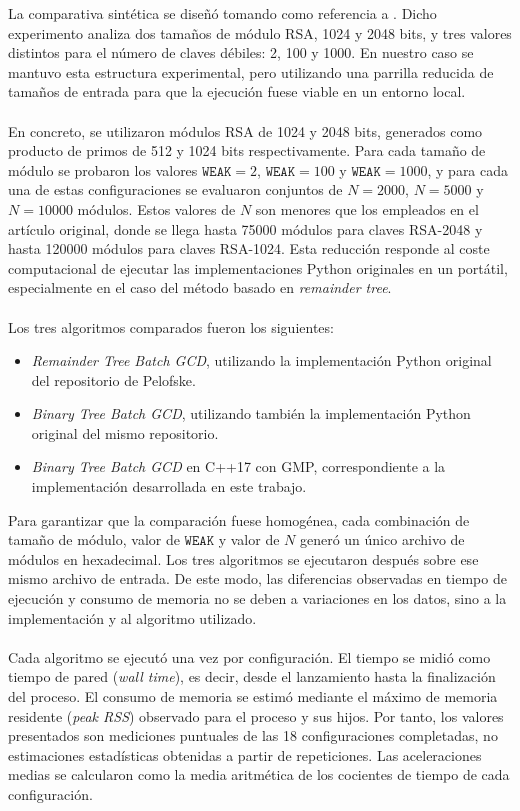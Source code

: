 La comparativa sintética se diseñó tomando como referencia a \citet[Figura 2]{pelofske2024efficient}. Dicho experimento analiza dos tamaños de módulo RSA, 1024 y 2048 bits, y tres valores distintos para el número de claves débiles: 2, 100 y 1000. En nuestro caso se mantuvo esta estructura experimental, pero utilizando una parrilla reducida de tamaños de entrada para que la ejecución fuese viable en un entorno local.
\\
\\
En concreto, se utilizaron módulos RSA de 1024 y 2048 bits, generados como producto de primos de 512 y 1024 bits respectivamente. Para cada tamaño de módulo se probaron los valores \(\texttt{WEAK}=2\), \(\texttt{WEAK}=100\) y \(\texttt{WEAK}=1000\), y para cada una de estas configuraciones se evaluaron conjuntos de \(N=2000\), \(N=5000\) y \(N=10000\) módulos. Estos valores de \(N\) son menores que los empleados en el artículo original, donde se llega hasta 75000 módulos para claves RSA-2048 y hasta 120000 módulos para claves RSA-1024. Esta reducción responde al coste computacional de ejecutar las implementaciones Python originales en un portátil, especialmente en el caso del método basado en \textit{remainder tree}.
\\
\\
Los tres algoritmos comparados fueron los siguientes:

\begin{itemize}
    \item \textit{Remainder Tree Batch GCD}, utilizando la implementación Python original del repositorio de Pelofske.
    \item \textit{Binary Tree Batch GCD}, utilizando también la implementación Python original del mismo repositorio.
    \item \textit{Binary Tree Batch GCD} en C++17 con GMP, correspondiente a la implementación desarrollada en este trabajo.
\end{itemize}

Para garantizar que la comparación fuese homogénea, cada combinación de tamaño de módulo, valor de \(\texttt{WEAK}\) y valor de \(N\) generó un único archivo de módulos en hexadecimal. Los tres algoritmos se ejecutaron después sobre ese mismo archivo de entrada. De este modo, las diferencias observadas en tiempo de ejecución y consumo de memoria no se deben a variaciones en los datos, sino a la implementación y al algoritmo utilizado.
\\
\\
Cada algoritmo se ejecutó una vez por configuración. El tiempo se midió como
tiempo de pared (\textit{wall time}), es decir, desde el lanzamiento hasta la finalización del proceso. El consumo de memoria se estimó mediante el máximo de memoria residente
(\textit{peak RSS}) observado para el proceso y sus hijos. Por tanto, los valores
presentados son mediciones puntuales de las 18 configuraciones completadas, no
estimaciones estadísticas obtenidas a partir de repeticiones. Las aceleraciones
medias se calcularon como la media aritmética de los cocientes de tiempo de cada
configuración.

